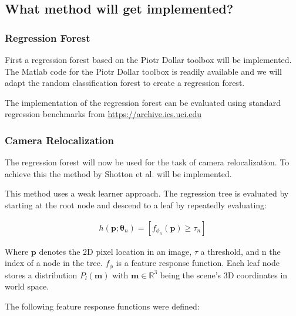 

\subsection{What method will get implemented?} %
\label{sub:what_method_will_get_implemented_}

\subsubsection*{Regression Forest} %
\label{ssub:regression_forest}

First a regression forest based on the Piotr Dollar toolbox \cite{piotr} will be implemented. The Matlab code for the Piotr Dollar toolbox is readily available and we will adapt the random classification forest to create a regression forest.

The implementation of the regression forest can be evaluated using standard regression benchmarks from
\href{https://archive.ics.uci.edu/ml/datasets.html?format=&task=reg&att=&area=&numAtt=&numIns=&type=&sort=nameUp&view=table}{https://archive.ics.uci.edu}


\subsubsection{Camera Relocalization} %
\label{ssub:camera_relocalization}

The regression forest will now be used for the task of camera relocalization. To achieve this the method by Shotton et al. \cite{shotton} will be implemented.

This method uses a weak learner approach. The regression tree is evaluated by starting at the root node and descend to a leaf by repeatedly evaluating:

\begin{eqnarray}\label{eqn:weaklearner}
  h(\mathbf{p};\mathbf{\theta}_n) = [ f_{\phi_n}(\mathbf{p}) \geq \tau_n ]
\end{eqnarray}


Where $\mathbf{p}$ denotes the 2D pixel location in an image, $\tau$ a threshold, and n the index of a node in the tree. $f_{\phi}$ is a feature response function. Each leaf node stores a distribution $P_{l}(\mathbf{m})$ with $\mathbf{m} \in \mathbb{R}^3$ being the scene's 3D coordinates in world space.

The following feature response functions were defined:

